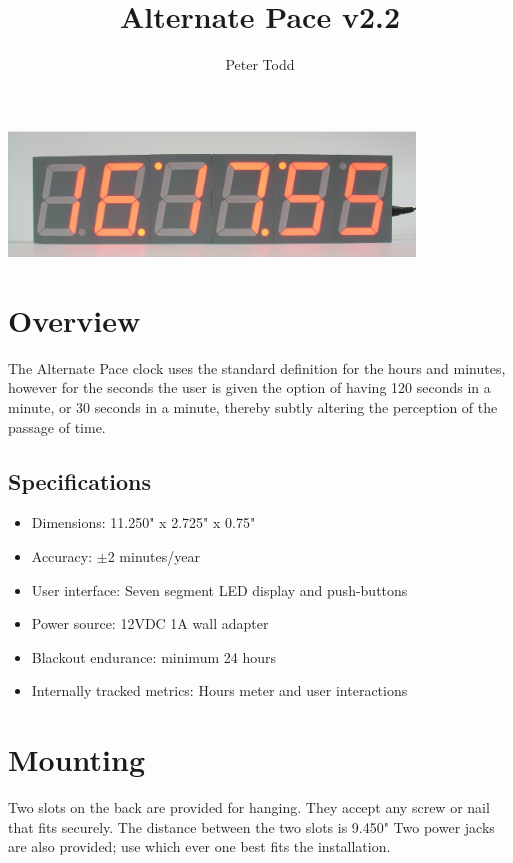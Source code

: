 \documentclass{article}
\makeatletter
\def\s@btitle{\relax}
\def\subtitle#1{\gdef\s@btitle{#1}}
\makeatother
\begin{document}
\title{Alternate Pace v2.2}
\subtitle{0123456789abcdef}
\author{Peter Todd}
\date{}
\maketitle

\includegraphics[width=4.25in]{figures/front-running-24hr.eps}

\section{Overview}

The Alternate Pace clock uses the standard definition for the hours and
minutes, however for the seconds the user is given the option of having 120
seconds in a minute, or 30 seconds in a minute, thereby subtly altering the
perception of the passage of time.

\subsection{Specifications}

\begin{itemize}
	\item Dimensions: 11.250" x 2.725" x 0.75"
	\item Accuracy: ${\pm}$2 minutes/year
	\item User interface: Seven segment LED display and push-buttons
	\item Power source: 12VDC 1A wall adapter
	\item Blackout endurance: minimum 24 hours
	\item Internally tracked metrics: Hours meter and user interactions
\end{itemize}

\section{Mounting}

Two slots on the back are provided for hanging. They accept any screw or nail
that fits securely. The distance between the two slots is 9.450" Two power
jacks are also provided; use which ever one best fits the installation.
\end{document}
